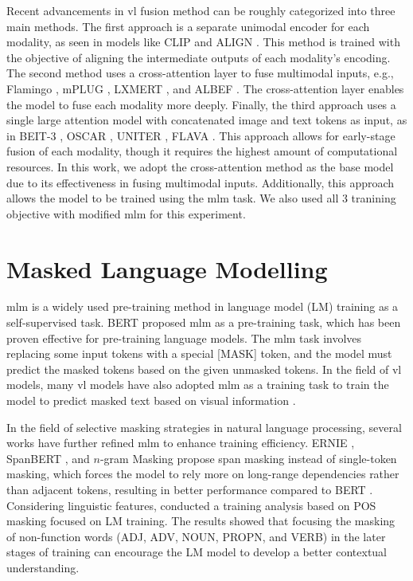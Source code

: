 Recent advancements in \acrshort{vl} fusion method can be roughly categorized into three main methods.  
The first approach is a separate unimodal encoder for each modality, as seen in models like CLIP \cite{clip} and ALIGN \cite{align}. 
This method is trained with the objective of aligning the intermediate outputs of each modality's encoding.  
The second method uses a cross-attention layer to fuse multimodal inputs, e.g., Flamingo \cite{flamingo}, mPLUG \cite{mplug}, LXMERT \cite{lxmert}, and ALBEF \cite{albef}. 
The cross-attention layer enables the model to fuse each modality more deeply.  
Finally, the third approach uses a single large attention model with concatenated image and text tokens as input, as in BEIT-3 \cite{beit-3}, OSCAR \cite{oscar}, UNITER \cite{uniter}, FLAVA \cite{flava}. 
This approach allows for early-stage fusion of each modality, though it requires the highest amount of computational resources.  
In this work, we adopt the cross-attention method as the base model due to its effectiveness in fusing multimodal inputs. 
Additionally, this approach allows the model to be trained using the \acrshort{mlm} task.
We also used all 3 tranining objective with modified \Acrshort{mlm} for this experiment.

\section{Masked Language Modelling}
\acrshort{mlm} is a widely used pre-training method in language model (LM) training \cite{bert, albert, dictbert, opt, realm} as a self-supervised task. 
BERT \cite{bert} proposed \acrshort{mlm} as a pre-training task, which has been proven effective for pre-training language models. 
The \acrshort{mlm} task involves replacing some input tokens with a special [MASK] token, and the model must predict the masked tokens based on the given unmasked tokens. 
In the field of \acrshort{vl} models, many \acrshort{vl} models have also adopted \acrshort{mlm} as a training task to train the model to predict masked text based on visual information \cite{albef, mplug, uniter, beit-3}.

In the field of selective masking strategies in natural language processing, several works have further refined \acrshort{mlm} to enhance training efficiency. 
ERNIE \cite{ERNIE}, SpanBERT \cite{spanBERT}, and \(n\)-gram Masking \cite{n-gram-masking} propose span masking instead of single-token masking, which forces the model to rely more on long-range dependencies rather than adjacent tokens, resulting in better performance compared to BERT \cite{bert}. 
Considering linguistic features,  conducted a training analysis based on POS masking focused on LM training. 
The results showed that focusing the masking of non-function words (ADJ, ADV, NOUN, PROPN, and VERB) in the later stages of training can encourage the LM model to develop a better contextual understanding.

